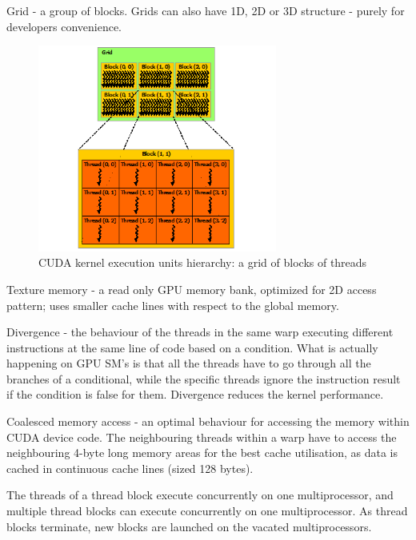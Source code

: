 \documentclass[12pt,a4paper]{report}
\newcommand{\draft}[1]{#1}
\begin{document}
Grid - a group of blocks. Grids can also have 1D, 2D or 3D structure - purely for developers convenience.
\begin{figure}
    \centering
    \includegraphics[width=0.7\textwidth]{pics/grid-of-thread-blocks.png}
    \caption{CUDA kernel execution units hierarchy: a grid of blocks of threads}
    \label{fig:grid}
\end{figure}
\FloatBarrier

Texture memory - a read only GPU memory bank, optimized for 2D access pattern; uses smaller cache lines with respect to the global memory.

Divergence - the behaviour of the threads in the same warp executing different instructions at the same line of code based on a condition. What is actually happening on GPU SM's is that all the threads have to go through all the branches of a conditional, while the specific threads ignore the instruction result if the condition is false for them. Divergence reduces the kernel performance.

Coalesced memory access - an optimal behaviour for accessing the memory within CUDA device code. The neighbouring threads within a warp have to access the neighbouring 4-byte long memory areas for the best cache utilisation, as data is cached in continuous cache lines (sized 128 bytes). 


%




\iffalse
The threads of a thread block execute concurrently on one multiprocessor, and multiple thread blocks can execute concurrently on one multiprocessor. As thread blocks terminate, new blocks are launched on the vacated multiprocessors.
\end{document}
